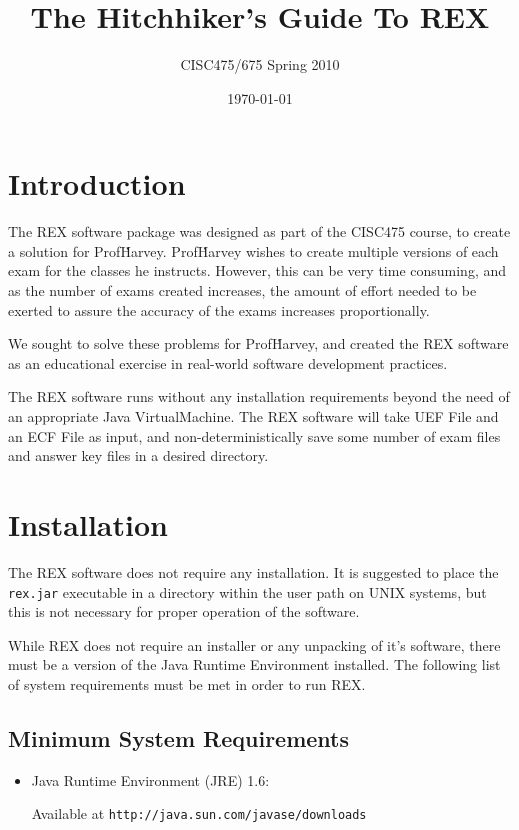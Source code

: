 \documentclass{article}
\author{CISC475/675 Spring 2010}
\title{The Hitchhiker's Guide To REX}
\date{\today}
\begin{document}
\maketitle
\tableofcontents
\newpage

\section{Introduction}
The REX software package was designed as part of the CISC475 course,
to create a solution for Prof\. Harvey. Prof\. Harvey wishes to create
multiple versions of each exam for the classes he instructs. However,
this can be very time consuming, and as the number of exams created
increases, the amount of effort needed to be exerted to assure the
accuracy of the exams increases proportionally.

We sought to solve these problems for Prof\. Harvey, and created the
REX software as an educational exercise in real-world software
development practices.

The REX software runs without any installation requirements beyond the
need of an appropriate Java VirtualMachine. The REX software will take
UEF File and an ECF File as input, and non-deterministically save
some number of exam files and answer key files in a desired directory.

\section{Installation}
The REX software does not require any installation. It is suggested to
place the \texttt{rex.jar} executable in a directory within the user
path on UNIX systems, but this is not necessary for proper operation
of the software.

While REX does not require an installer or any unpacking of it's software,
there must be a version of the Java Runtime Environment installed. The
following list of system requirements must be met in order to run REX.

\subsection{Minimum System Requirements}
\begin{itemize}
\item Java Runtime Environment (JRE) 1.6: 

Available at 
\verb|http://java.sun.com/javase/downloads|
\end{itemize}
\end{document}
